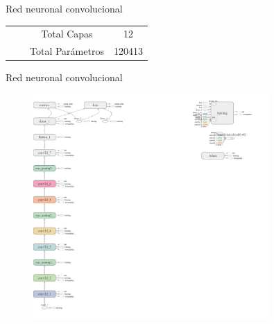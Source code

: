 \documentclass[10pt]{beamer}
\begin{document}
\begin{frame}{Red neuronal convolucional}
\begin{table}[!h]
{\begin{tabular}{@{}cccccc@{}}
                                                & \multicolumn{1}{c|}{}              & \multicolumn{2}{c|}{Total Capas}                                                                                                                                                            & \multicolumn{2}{c|}{12}                                                                                                                                                                          \\ \cmidrule(l){3-6} 
                                                & \multicolumn{1}{c|}{}              & \multicolumn{2}{c|}{Total Parámetros}                                                                                                                                                       & \multicolumn{2}{c|}{120413}                                                                                                                                                                      \\ \cmidrule(l){3-6} 
        \end{tabular}%
        }
    \end{table}

\end{frame}

\begin{frame}{Red neuronal convolucional}
    \begin{figure}[!h] 
        \centering
        \includegraphics[width=0.8\textwidth]{../img/arqconv}   
    \end{figure}
\end{frame}
\end{document}
